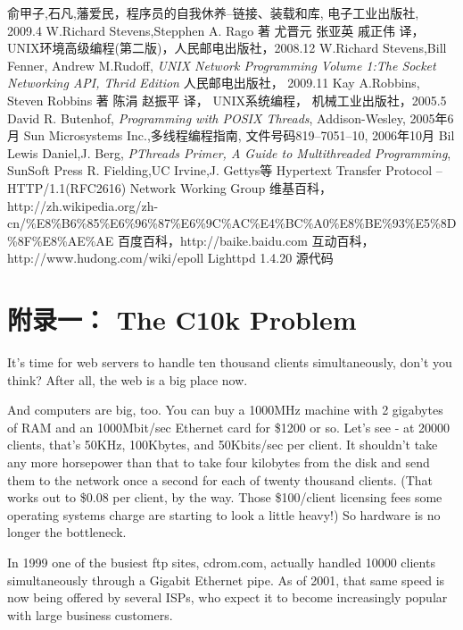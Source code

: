 \documentclass[12pt, twoside, a4paper, xetex]{report}
\begin{document}
\begin{thebibliography}{99}
俞甲子,石凡,藩爱民，程序员的自我休养--链接、装载和库, 电子工业出版社, 2009.4
W.Richard Stevens,Stepphen A. Rago 著 尤晋元 张亚英 戚正伟 译， UNIX环境高级编程(第二版)，人民邮电出版社，2008.12
W.Richard Stevens,Bill Fenner, Andrew M.Rudoff, \emph{UNIX Network Programming Volume 1:The Socket Networking API, Thrid Edition} 人民邮电出版社， 2009.11
 Kay A.Robbins, Steven Robbins 著 陈涓 赵振平 译， UNIX系统编程， 机械工业出版社，2005.5
David R. Butenhof, \emph{Programming with POSIX Threads}, Addison-Wesley, 2005年6月
Sun Microsystems Inc.,多线程编程指南, 文件号码819–7051–10, 2006年10月
Bil Lewis Daniel,J. Berg, \emph{PThreads Primer, A Guide to Multithreaded Programming}, SunSoft Press
R. Fielding,UC Irvine,J. Gettys等 Hypertext Transfer Protocol -- HTTP/1.1(RFC2616) Network Working Group
维基百科，http://zh.wikipedia.org/zh-cn/\%E8\%B6\%85\%E6\%96\%87\%E6\%9C\%AC\%E4\%BC\%A0\%E8\%BE\%93\%E5\%8D\%8F\%E8\%AE\%AE
百度百科，http://baike.baidu.com
互动百科，http://www.hudong.com/wiki/epoll
Lighttpd 1.4.20 源代码
\end{thebibliography}


\chapter{附录一： The C10k Problem}

It's time for web servers to handle ten thousand clients simultaneously, don't you think? After all, the web is a big place now.

And computers are big, too. You can buy a 1000MHz machine with 2 gigabytes of RAM and an 1000Mbit/sec Ethernet card for \$1200 or so. Let's see - at 20000 clients, that's 50KHz, 100Kbytes, and 50Kbits/sec per client. It shouldn't take any more horsepower than that to take four kilobytes from the disk and send them to the network once a second for each of twenty thousand clients. (That works out to \$0.08 per client, by the way. Those \$100/client licensing fees some operating systems charge are starting to look a little heavy!) So hardware is no longer the bottleneck.

In 1999 one of the busiest ftp sites, cdrom.com, actually handled 10000 clients simultaneously through a Gigabit Ethernet pipe. As of 2001, that same speed is now being offered by several ISPs, who expect it to become increasingly popular with large business customers.
\end{document}
